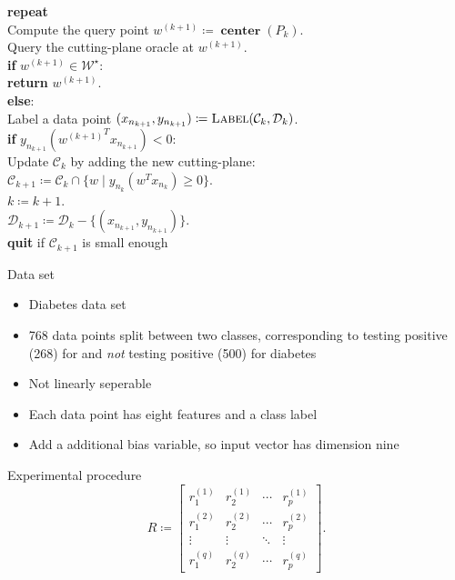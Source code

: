 \documentclass[pdf, 12pt]
{beamer}
\theoremstyle{definition}
\theoremstyle{remark}
\newcommand{\ind}{\hspace*{0.5cm}}
\newcommand{\transpose}{T}
\DeclareMathOperator{\centerr}{\textbf{center}}
\begin{document}
\begin{frame}
\ind \textbf{repeat} \\
            \ind\ind Compute the query point $w^{(k+1)} \coloneqq \centerr({P}_k)$. \\
            \ind\ind Query the cutting-plane oracle at $w^{(k+1)}$. \\
            \ind\ind \textbf{if} $w^{(k+1)} \in \mathcal{W}^\star$: \\
            \ind\ind\ind\textbf{return} $w^{(k+1)}$. \\
            \ind\ind \textbf{else}: \\
            \ind\ind\ind Label a data point $(x_{n_{k+1}}, y_{n_{k+1}}) \coloneqq \textsc{Label}(\mathcal{C}_k, \mathcal{D}_k)$. \\
            \ind\ind\ind \textbf{if} $y_{n_{k+1}} ({w^{(k+1)}}^\transpose x_{n_{k+1}}) < 0:$ \\
            \ind\ind\ind\ind Update $\mathcal{C}_k$ by adding the new cutting-plane: \\
            \ind\ind\ind\ind\ind $\mathcal{C}_{k+1} \coloneqq \mathcal{C}_{k} \cap \{w \;|\; y_{n_k} (w^\transpose x_{n_k}) \geq 0\}$. \\
            \ind\ind $k \coloneqq k + 1$. \\
            \ind\ind $\mathcal{D}_{k+1} \coloneqq \mathcal{D}_k - \{(x_{n_{k+1}}, y_{n_{k+1}})\}$. \\
            \ind\ind \textbf{quit} if $\mathcal{C}_{k+1}$ is small enough
\end{frame}

\begin{frame}{Data set}
      \begin{itemize}
            \item Diabetes data set
            \item 768 data points split between two classes, corresponding to testing positive (268) for  and \emph{not} testing positive (500) for diabetes
            \item Not linearly seperable
            \item Each data point has eight features and a class label
            \item Add a additional bias variable, so input vector has dimension nine
      \end{itemize}  
\end{frame}

\begin{frame}{Experimental procedure}
            \begin{equation*}
            R \coloneqq \begin{bmatrix}
            r_1^{(1)} &  r_2^{(1)}  & \cdots & r_p^{(1)}\\
            r_1^{(2)}  &  r_2^{(2)} & \cdots & r_p^{(2)}\\
            \vdots & \vdots & \ddots & \vdots\\
            r_1^{(q)}  &  r_2^{(q)}  & \cdots & r_p^{(q)}
            \end{bmatrix}.
        \end{equation*}
\end{frame}
\end{document}
